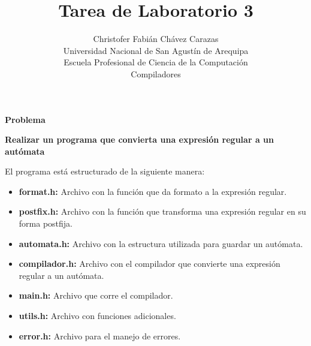 \documentclass[a4paper,12pt]{article}
\begin{document}
\title{Tarea de Laboratorio 3}
\author{
Christofer Fabián Chávez Carazas \\
\small{Universidad Nacional de San Agustín de Arequipa} \\
\small{Escuela Profesional de Ciencia de la Computación} \\
\small{Compiladores}
}
\date{}

\maketitle

\begin{large}
 \textbf{Problema}
\end{large}


\textbf{Realizar un programa que convierta una expresión regular a un autómata}

El programa está estructurado de la siguiente manera:

\begin{itemize}
 \item \textbf{format.h:} Archivo con la función que da formato a la expresión regular.
 \item \textbf{postfix.h:} Archivo con la función que transforma una expresión regular en su forma postfija.
 \item \textbf{automata.h:} Archivo con la estructura utilizada para guardar un autómata.
 \item \textbf{compilador.h:} Archivo con el compilador que convierte una expresión regular a un autómata.
 \item \textbf{main.h:} Archivo que corre el compilador.
 \item \textbf{utils.h:} Archivo con funciones adicionales.
 \item \textbf{error.h:} Archivo para el manejo de errores.
\end{itemize}
\end{document}
